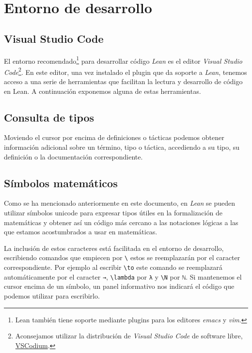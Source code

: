\section{Entorno de desarrollo}\label{sec:entorno}

\subsection*{Visual Studio Code}

El entorno recomendado\footnote{Lean también tiene soporte mediante plugins para
	los editores \textit{emacs} y \textit{vim}.} para desarrollar código
\textit{Lean} es el editor \textit{Visual Studio Code}\footnote{Aconsejamos
	utilizar la distribución de \textit{Visual Studio Code} de software libre,
	\href{https://vscodium.com/}{VSCodium}.}. En este editor, una vez instalado el
plugin que da soporte a \textit{Lean}, tenemos acceso a una serie de
herramientas que facilitan la lectura y desarrollo de código en Lean. A
continuación exponemos alguna de estas herramientas.

\subsection*{Consulta de tipos}

Moviendo el cursor por encima de definiciones o tácticas podemos obtener
información adicional sobre un término, tipo o táctica, accediendo a su tipo, su
definición o la documentación correspondiente.

\subsection*{Símbolos matemáticos}

Como se ha mencionado anteriormente en este documento, en \textit{Lean} se
pueden utilizar símbolos unicode para expresar tipos útiles en la formalización
de matemáticas y obtener así un código más cercano a las notaciones lógicas a
las que estamos acostumbrados a usar en matemáticas.

La inclusión de estos caracteres está facilitada en el entorno de desarrollo,
escribiendo comandos que empiecen por \texttt{\textbackslash} estos se
reemplazarán por el caracter correspondiente. Por ejemplo al escribir
\texttt{\textbackslash to} este comando se reemplazará automáticamente por el
caracter \lstinline{→}, \texttt{\textbackslash lambda} por \lstinline{λ} y
\texttt{\textbackslash N} por \lstinline{ℕ}. Si mantenemos el cursor encima de
un símbolo, un panel informativo nos indicará el código que podemos utilizar
para escribirlo.

